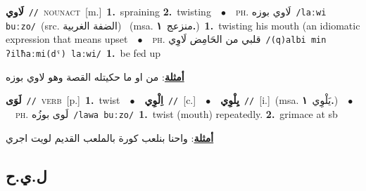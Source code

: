 \documentclass[10pt,a4paper,twoside]{article} %
\begin{document}
\begin{multicols}{2}
{\setlength\topsep{0pt}\textbf{\foreignlanguage{arabic}{لَاوي}}\ {\color{gray}\texttt{//}\color{black}}\ \textsc{noun\textunderscore act}\ [m.]\ \textbf{1.}~spraining  \textbf{2.}~twisting\ \ $\bullet$\ \ \textsc{ph.} \color{gray} \foreignlanguage{arabic}{لَاوي بوزه}\color{black}\ {\color{gray}\texttt{/{\sffamily laːwi buːzo}/}\color{black}}\ \color{gray}(src. \foreignlanguage{arabic}{الضفة الغربية})\color{black}\ \color{gray} (msa. \foreignlanguage{arabic}{منزعج}~\foreignlanguage{arabic}{\textbf{١.}})\color{black}\ \textbf{1.}~twisting his mouth (an idiomatic expression that means upset\ \ $\bullet$\ \ \textsc{ph.} \color{gray} \foreignlanguage{arabic}{قلبي من الحَامِض لَاوِي}\color{black}\ {\color{gray}\texttt{/{\sffamily (q)albi min ʔilħaːmi(dˤ) laːwi}/}\color{black}}\ \textbf{1.}~be fed up\  \begin{flushright}\color{gray}\foreignlanguage{arabic}{\textbf{\underline{\foreignlanguage{arabic}{أمثلة}}}: من او ما حكيتله القصة وهو لاوي بوزه}\end{flushright}\color{black}} \vspace{2mm}

{\setlength\topsep{0pt}\textbf{\foreignlanguage{arabic}{لَوَى}}\ {\color{gray}\texttt{//}\color{black}}\ \textsc{verb}\ [p.]\ \textbf{1.}~twist\ \ $\bullet$\ \ \setlength\topsep{0pt}\textbf{\foreignlanguage{arabic}{اِلْوِي}}\ {\color{gray}\texttt{//}\color{black}}\ [c.]\ \ $\bullet$\ \ \setlength\topsep{0pt}\textbf{\foreignlanguage{arabic}{يِلْوِي}}\ {\color{gray}\texttt{//}\color{black}}\ [i.]\ \color{gray}(msa. \foreignlanguage{arabic}{يَلْوِي}~\foreignlanguage{arabic}{\textbf{١.}})\color{black}\ \ $\bullet$\ \ \textsc{ph.} \color{gray} \foreignlanguage{arabic}{لَوى بوزُه}\color{black}\ {\color{gray}\texttt{/{\sffamily lawa buːzo}/}\color{black}}\ \textbf{1.}~twist (mouth) repeatedly.  \textbf{2.}~grimace at sb\  \begin{flushright}\color{gray}\foreignlanguage{arabic}{\textbf{\underline{\foreignlanguage{arabic}{أمثلة}}}: واحنا بنلعب كورة بالملعب القديم لويت اجري}\end{flushright}\color{black}} \vspace{2mm}

\vspace{-3mm}
\subsection*{\color{blue}\foreignlanguage{arabic}{ل.ي.ح}\color{blue}{}} 


\end{multicols}
\end{document}
